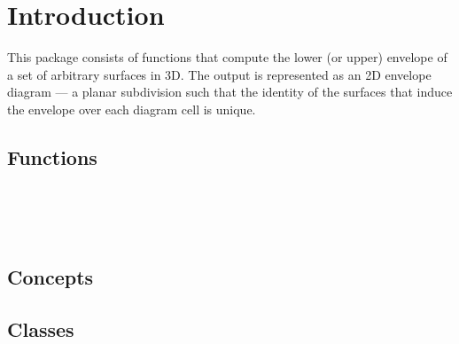 \label{chapterEnvelope_3_ref}
{}

\section*{Introduction}
\label{env3_ref_sec:intro}

This package consists of functions that compute the lower (or upper)
envelope of a set of arbitrary surfaces in 3D. The output is
represented as an 2D envelope diagram --- a planar subdivision such
that the identity of the surfaces that induce the envelope over each
diagram cell is unique.

\subsection*{Functions}

\\
\\
\\

\subsection*{Concepts}


\subsection*{Classes}

\\
\\
\\
\\
\\
